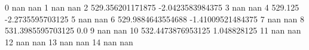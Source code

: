 0 nan nan
1 nan nan
2 529.356201171875 -2.0423583984375
3 nan nan
4 529.125 -2.2735595703125
5 nan nan
6 529.9884643554688 -1.41009521484375
7 nan nan
8 531.3985595703125 0.0
9 nan nan
10 532.4473876953125 1.048828125
11 nan nan
12 nan nan
13 nan nan
14 nan nan
